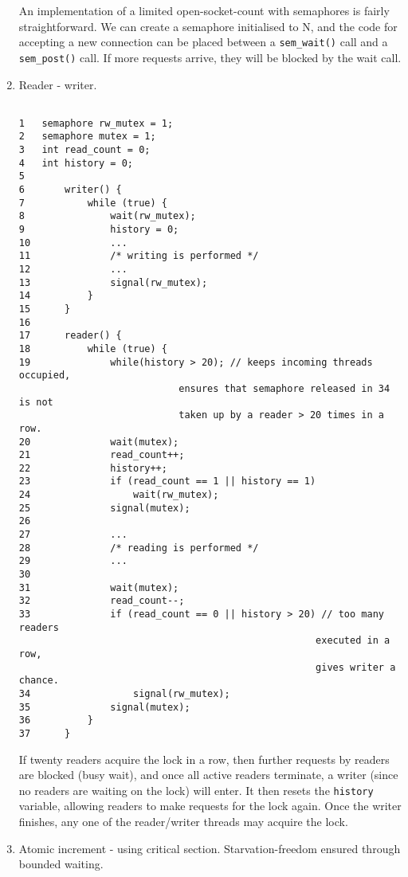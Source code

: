 \documentclass{amsart}
\begin{document}
\begin{enumerate}
            An implementation of a limited open-socket-count with semaphores is fairly straightforward.
            We can create a semaphore initialised to N, and the code for accepting a new connection 
            can be placed between a \texttt{sem\_wait()} call and a \texttt{sem\_post()} call. 
            If more requests arrive, they will be blocked by the wait call.

        \item Reader - writer.
            
            \begin{lstlisting}[escapechar=@]

1   semaphore rw_mutex = 1; 
2   semaphore mutex = 1; 
3   int read_count = 0;
4   int history = 0;
5       
6       writer() {
7           while (true) { 
8               wait(rw_mutex);
9               history = 0;
10              ...
11              /* writing is performed */
12              ... 
13              signal(rw_mutex);
14          }
15      }
16
17      reader() {
18          while (true) { 
19              while(history > 20); // keeps incoming threads occupied, 
                            ensures that semaphore released in 34 is not 
                            taken up by a reader > 20 times in a row.
20              wait(mutex);
21              read_count++;
22              history++;
23              if (read_count == 1 || history == 1)
24                  wait(rw_mutex); 
25              signal(mutex);
26
27              ...
28              /* reading is performed */
29              ... 
30              
31              wait(mutex);
32              read_count--;
33              if (read_count == 0 || history > 20) // too many readers 
                                                    executed in a row, 
                                                    gives writer a chance.
34                  signal(rw_mutex); 
35              signal(mutex);
36          }
37      }
        \end{lstlisting}    

        If twenty readers acquire the lock in a row, then further requests by readers are blocked 
        (busy wait), and once all active readers terminate, a writer (since no readers are waiting on 
        the lock) will enter. It then resets the \texttt{history} variable, allowing readers to make 
        requests for the lock again. Once the writer finishes, any one of the reader/writer threads 
        may acquire the lock.

        \item Atomic increment - using critical section. Starvation-freedom ensured through bounded waiting.
        

\end{enumerate}
\end{document}
